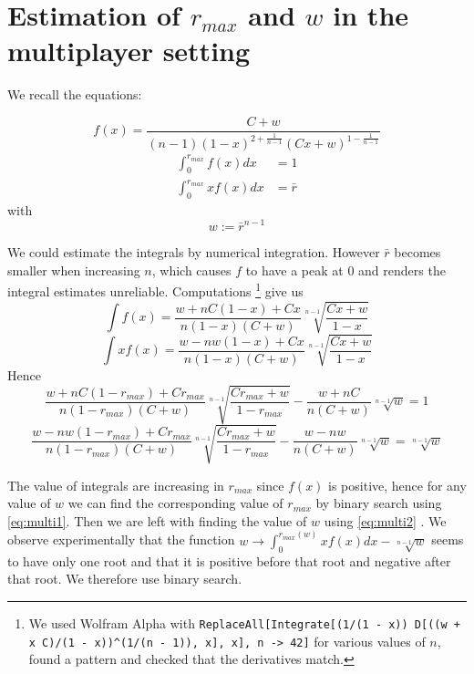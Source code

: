 \documentclass[preprint,12pt,authoryear,doubleblind]{elsarticle}
\theoremstyle{definition}
\begin{document}
\section{\texorpdfstring{Estimation of ${r_{max}}$ and $w$ in the multiplayer setting}{Estimation of rmax and w in the multiplayer setting}}
\label{estimate}

We recall the equations:

$$f(x) = \frac{C + w}{(n-1)(1-x)^{2+\frac{1}{n-1}} (C x + w)^{1 - \frac{1}{n-1}}}$$
\begin{align*}
        \int_0^{r_{max}} f(x) dx &= 1 \\
        \int_0^{r_{max}} x f(x) dx &= \bar r 
\end{align*}
with $$w := \bar r ^ {n-1}$$

We could estimate the integrals by numerical integration. However $\bar r$ becomes smaller when increasing $n$, which causes $f$ to have a peak at $0$ and renders the integral estimates unreliable.
Computations \footnote{We used Wolfram Alpha with \texttt{ReplaceAll[Integrate[(1/(1 - x)) D[((w + x C)/(1 - x))\^{}(1/(n - 1)), x], x], {n -> 42}]} for various values of $n$, found a pattern and checked that the derivatives match.} give us 
$$\int f(x) = \frac{w + nC(1-x) + Cx}{n (1 - x)(C+w)} \sqrt[n-1]{\frac{Cx + w}{1-x}}$$
$$\int x f(x) = \frac{w - n w  (1-x) + Cx}{n (1-x)(C+w)}\sqrt[n-1]{\frac{Cx+w}{1-x}}$$
Hence
\begin{equation}
\label{eq:multi1}
\frac{w + nC(1-{r_{max}}) + C{r_{max}}}{n (1 - {r_{max}})(C+w)} \sqrt[n-1]{\frac{C{r_{max}} + w}{1-{r_{max}}}} -  \frac{w + nC}{n (C+w)} \sqrt[n-1]{w} = 1
\end{equation}
\begin{equation}
\label{eq:multi2}
\frac{w - n w  (1-{r_{max}}) + C{r_{max}}}{n (1-{r_{max}})(C+w)}\sqrt[n-1]{\frac{C{r_{max}}+w}{1-{r_{max}}}} - \frac{w - n w}{n (C+w)}\sqrt[n-1]{w} = \sqrt[n-1]{w}
\end{equation}

The value of integrals are increasing in ${r_{max}}$ since $f(x)$ is positive, hence for any value of $w$ we can find the corresponding value of ${r_{max}}$ by binary search using \eqref{eq:multi1}. Then we are left with finding the value of $w$ using \eqref{eq:multi2} . We observe experimentally that the function $w \rightarrow \int_0^{{r_{max}}(w)}xf(x)dx - \sqrt[n-1]{w}$ seems to have only one root and that it is positive before that root and negative after that root. We therefore use binary search.
\end{document}
